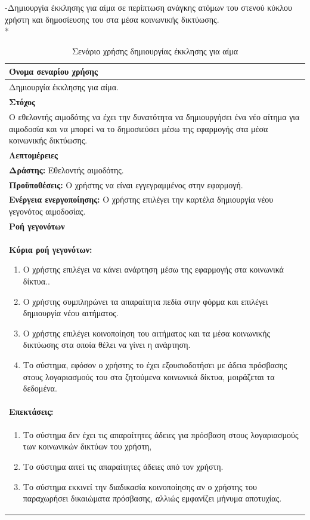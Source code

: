 -Δημιουργία έκκλησης για αίμα σε περίπτωση ανάγκης ατόμων του στενού κύκλου χρήστη και δημοσίευσης του στα μέσα κοινωνικής δικτύωσης.
\\*
\begin{table}[H]
	\begin{center}
	    \begin{tabular}{|p{\dimexpr \linewidth-2\tabcolsep}|}
	    \hline
	    \rowcolor{grayy}
	    \textbf{Όνομα σεναρίου χρήσης}
	    \\ \hline    
	    Δημιουργία έκκλησης για αίμα.
	     \\ \hline
	    \rowcolor{grayy}
	    \textbf{\textbf{Στόχος}}
	    \\ \hline
	 	 Ο εθελοντής αιμοδότης να έχει την δυνατότητα να δημιουργήσει ένα νέο αίτημα για αιμοδοσία και να μπορεί να το δημοσιεύσει μέσω της εφαρμογής στα μέσα κοινωνικής δικτύωσης.
	    \\ \hline
	    \rowcolor{grayy}
	    \textbf{Λεπτομέρειες}
	    \\ \hline
		\textbf{Δράστης:} Εθελοντής αιμοδότης.
		\\*
		\textbf{Προϋποθέσεις:} Ο χρήστης να είναι εγγεγραμμένος στην εφαρμογή.
		\\*
		\textbf{Ενέργεια ενεργοποίησης:} Ο χρήστης επιλέγει την καρτέλα δημιουργία νέου γεγονότος αιμοδοσίας.
		\\ \hline
		\rowcolor{grayy}    
	    \textbf{Ροή γεγονότων}
	    \\ \hline
		\textbf{Κύρια ροή γεγονότων:}
		\begin{enumerate}
		\item	 Ο χρήστης επιλέγει να κάνει ανάρτηση μέσω της εφαρμογής  στα κοινωνικά δίκτυα..
		\item Ο χρήστης συμπληρώνει τα απαραίτητα πεδία στην φόρμα και επιλέγει δημιουργία νέου αιτήματος.
		\item Ο χρήστης επιλέγει κοινοποίηση του αιτήματος και τα μέσα κοινωνικής δικτύωσης στα οποία θέλει να γίνει η ανάρτηση.
	   \item Το σύστημα, εφόσον ο χρήστης το έχει εξουσιοδοτήσει με άδεια πρόσβασης στους λογαριασμούς του στα ζητούμενα κοινωνικά δίκτυα, μοιράζεται τα δεδομένα.
		\end{enumerate}
		\\*
		\textbf{Επεκτάσεις:}
		   \\ \hline
		\begin{enumerate}
			\item Το σύστημα δεν έχει τις απαραίτητες άδειες για πρόσβαση στους λογαριασμούς των κοινωνικών δικτύων του χρήστη,
			\item Το σύστημα αιτεί τις απαραίτητες άδειες από τον χρήστη.
			\item Το σύστημα εκκινεί την διαδικασία κοινοποίησης αν ο χρήστης του παραχωρήσει δικαιώματα πρόσβασης, αλλιώς εμφανίζει μήνυμα αποτυχίας.
		\end{enumerate}
		\\ \hline
	    \end{tabular}
	    \caption{Σενάριο χρήσης δημιουργίας έκκλησης για αίμα}
	    \label{tab:create_blood_donor_request} 
	\end{center}
\end{table}

